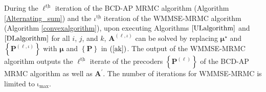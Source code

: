 \documentclass[9pt,journal]{IEEEtran}
\newcommand{\paren}[1]{\left({#1}\right)}
\newcommand{\bracket}[1]{{\left [{#1}\right ]}}
\newcommand{\braces}[1]{{\left\{ {#1}\right\}}}
\newcommand{\ith}[1]    {{#1}^{\underline{\text{th}}}}
\newcommand{\PiB}{\mathbf{P}_{\textrm{u},i}\bracket{k}}
\theoremstyle{definition}
\begin{document}

During the $\ith{\ell}$ iteration of the BCD-AP MRMC algorithm (Algorithm \ref{Alternating_sum}) and the $\ith{\iota}$ iteration of the WMMSE-MRMC algorithm (Algorithm \ref{convexalgorithm}), upon executing Algorithms $\ref{ULalgorithm}$ and $\ref{DLalgorithm}$ for all $i$, $j$, and $k$, $\mathbf{A}^{\paren{\ell,\iota}}$ can be solved by replacing  $\boldsymbol{\mu}^\star$ and $\braces{\mathbf{P}^{\paren{\ell,\iota}}}$ with $\boldsymbol{\mu}$ and $\braces{\mathbf{P}}$ in $\paren{\mathrm{\ref{ak}}}$.  The output of the WMMSE-MRMC algorithm outputs the $\ith{\ell}$ iterate of the precoders $\braces{\mathbf{P}^{\paren{\ell}}}$ of the BCD-AP MRMC algorithm as well as $\mathbf{A}^\prime$.  %
The number of iterations for  WMMSE-MRMC is limited to $\mathrm{\iota}_{\textrm{max}}$.
\end{document}
